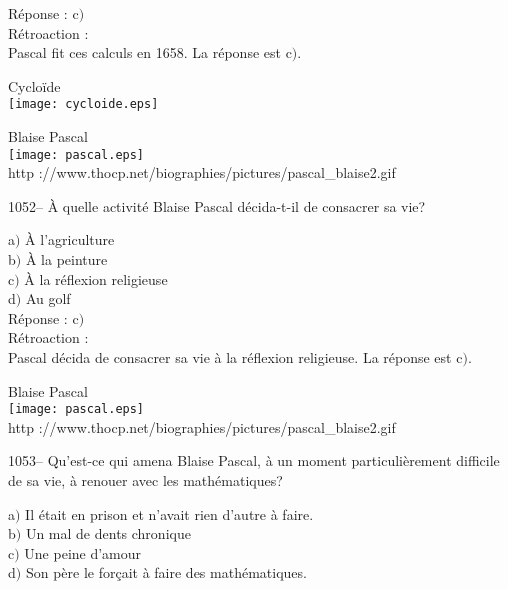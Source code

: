 ﻿\documentclass[letterpaper, 12pt]{article}
\begin{document}
R\'eponse : c$)$\\

R\'etroaction : \\
Pascal fit ces calculs en 1658.
La r\'eponse est c$)$.\\

        \begin{center}

Cyclo\"ide\\
    \texttt{[image: cycloide.eps]}\\
    \end{center}

        \begin{center}
        Blaise Pascal\\
    \texttt{[image: pascal.eps]}\\
        {\footnotesize http
://www.thocp.net/biographies/pictures/pascal\_blaise2.gif}
    \end{center}

1052-- \`A quelle activit\'e Blaise Pascal d\'ecida-t-il de
consacrer sa vie?

a$)$ \`A l'agriculture \\
b$)$ \`A la peinture  \\
c$)$ \`A la r\'eflexion religieuse  \\
d$)$ Au golf\\

R\'eponse : c$)$\\

R\'etroaction : \\
Pascal d\'ecida de consacrer sa vie \`a la r\'eflexion religieuse.
La r\'eponse est c$)$.\\

        \begin{center}
        Blaise Pascal\\
    \texttt{[image: pascal.eps]}\\
        {\footnotesize http
://www.thocp.net/biographies/pictures/pascal\_blaise2.gif}
    \end{center}

1053-- Qu'est-ce qui amena Blaise Pascal, \`a un moment
particuli\`erement difficile de sa vie, \`a renouer avec les
math\'ematiques?

a$)$ Il \'etait en prison et n'avait rien d'autre \`a faire. \\
b$)$ Un mal de dents chronique  \\
c$)$ Une peine d'amour  \\
d$)$ Son p\`ere le for\c cait \`a faire des math\'ematiques.\\
\end{document}
